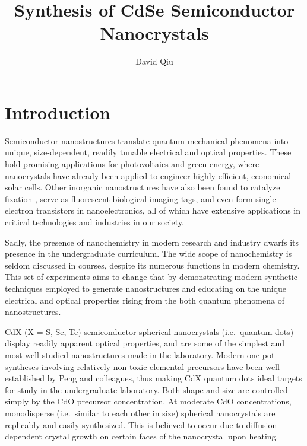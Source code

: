 \documentclass[journal = jceda8, manuscript = article]{achemso}
\title{Synthesis of CdSe Semiconductor Nanocrystals}
\author{David Qiu}
\affiliation{Department of Chemistry, University of Illinois at
Urbana-Champaign, 505 S Matthews Avenue, Urbana, IL, 61801}
\begin{document}
\section{Introduction}


Semiconductor nanostructures translate quantum-mechanical phenomena into unique,
size-dependent, readily tunable electrical and optical
properties.\cite{nano_rev} These hold promising applications for photovoltaics
and green energy, where nanocrystals have already been applied to engineer
highly-efficient, economical solar cells. \cite{solar_1, solar_2, solar_3}
Other inorganic nanostructures have also been found to catalyze  fixation
\cite{co2_1, co2_2}, serve as fluorescent biological imaging tags, \cite{bio_1,
bio_2} and even form single-electron transistors in nanoelectronics,
\cite{nano_elec} all of which have extensive applications in critical
technologies and industries in our society.

Sadly, the presence of nanochemistry in modern research and industry dwarfs its
presence in the undergraduate curriculum. The wide scope of nanochemistry is
seldom discussed in courses, despite its numerous functions in modern chemistry.
This set of experiments aims to change that by demonstrating modern synthetic
techniques employed to generate nanostructures and educating on the unique
electrical and optical properties rising from the both quantum phenomena of
nanostructures.

CdX (X = S, Se, Te) semiconductor spherical nanocrystals (i.e.\ quantum dots)
display readily apparent optical properties, and are some of the simplest and
most well-studied nanostructures made in the laboratory. Modern one-pot
syntheses involving relatively non-toxic elemental precursors have been
well-established by Peng and colleagues, thus making CdX quantum dots ideal
targets for study in the undergraduate laboratory. \cite{peng_1, peng_2} Both
shape and size are controlled simply by the CdO precursor concentration.  At
moderate CdO concentrations, monodisperse (i.e.\ similar to each other in size)
spherical nanocrystals are replicably and easily synthesized.  This is believed
to occur due to diffusion-dependent crystal growth on certain faces of the
nanocrystal upon heating. \cite{peng_mechanism}
\end{document}

